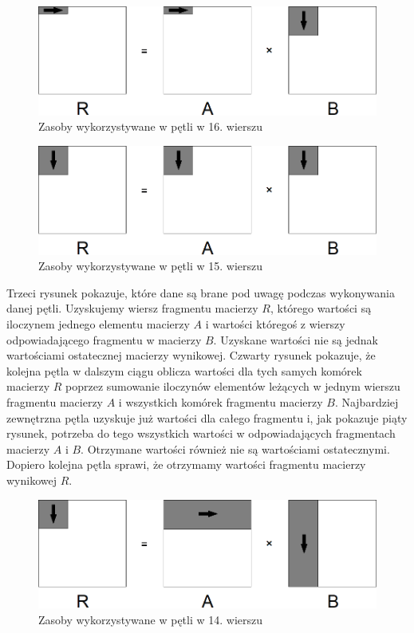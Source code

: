 \documentclass{article}
\begin{document}
\begin{figure}[H]
	\centering
	\includegraphics[width=\linewidth]{./images/6/lokIn2.png}
	\caption{Zasoby wykorzystywane w pętli w 16. wierszu}
	\label{fig:6inner2}
\end{figure}

\begin{figure}[H]
	\centering
	\includegraphics[width=\linewidth]{./images/6/lokIn3.png}
	\caption{Zasoby wykorzystywane w pętli w 15. wierszu}
	\label{fig:6inner3}
\end{figure}

Trzeci rysunek pokazuje, które dane są brane pod uwagę podczas wykonywania danej pętli. Uzyskujemy wiersz fragmentu macierzy $R$, którego wartości są iloczynem jednego elementu macierzy $A$ i wartości któregoś z wierszy odpowiadającego fragmentu w macierzy $B$. Uzyskane wartości nie są jednak wartościami ostatecznej macierzy wynikowej. Czwarty rysunek pokazuje, że kolejna pętla w dalszym ciągu oblicza wartości dla tych samych komórek macierzy $R$ poprzez sumowanie iloczynów elementów leżących w jednym wierszu fragmentu macierzy $A$ i wszystkich komórek fragmentu macierzy $B$. Najbardziej zewnętrzna pętla uzyskuje już wartości dla całego fragmentu i, jak pokazuje piąty rysunek, potrzeba do tego wszystkich wartości w odpowiadających fragmentach macierzy $A$ i $B$. Otrzymane wartości również nie są wartościami ostatecznymi. Dopiero kolejna pętla sprawi, że otrzymamy wartości fragmentu macierzy wynikowej $R$.

\begin{figure}[H]
	\centering
	\includegraphics[width=\linewidth]{./images/6/lokMed.png}
	\caption{Zasoby wykorzystywane w pętli w 14. wierszu}
	\label{fig:6medium}
\end{figure}
\end{document}
